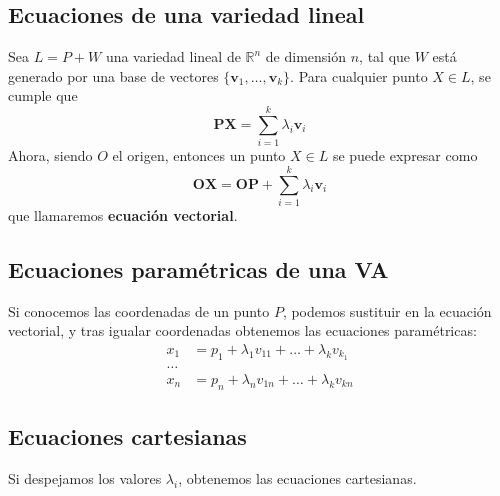 \documentclass{article}
\begin{document}
\subsection{Ecuaciones de una variedad lineal}
Sea $L=P+W$ una variedad lineal de $\mathbb{R}^{n}$ de dimensión $n$, tal que $W$ está generado por una base de vectores $\{ \mathbf{v}_{1},\dots ,\mathbf{v}_{k} \}$. Para cualquier punto $X \in L$, se cumple que
\[
	\mathbf{PX}= \sum_{i=1}^{k} \lambda_{i} \mathbf{v}_{i}
\]
Ahora, siendo $O$ el origen, entonces un punto $X \in L$ se puede expresar como
\[
	\mathbf{OX} = \mathbf{OP} + \sum_{i=1}^{k} \lambda_{i} \mathbf{v}_{i}
\]
que llamaremos \textbf{ecuación vectorial}.
\subsection{Ecuaciones paramétricas de una VA}
Si conocemos las coordenadas de un punto $P$, podemos sustituir en la ecuación vectorial, y tras igualar coordenadas obtenemos las ecuaciones paramétricas:
\begin{equation*}
	\begin{split}
		x_1 &= p_1 + \lambda_1v_{11}+\dots +\lambda_{k}v_{k_1}\\
		\dots \\
		x_{n} &= p_{n} + \lambda_{n}v_{1n} + \dots +\lambda_{k}v_{kn}
	\end{split}
\end{equation*}
\subsection{Ecuaciones cartesianas}
Si despejamos los valores $\lambda_{i}$, obtenemos las ecuaciones cartesianas. 
\end{document}
